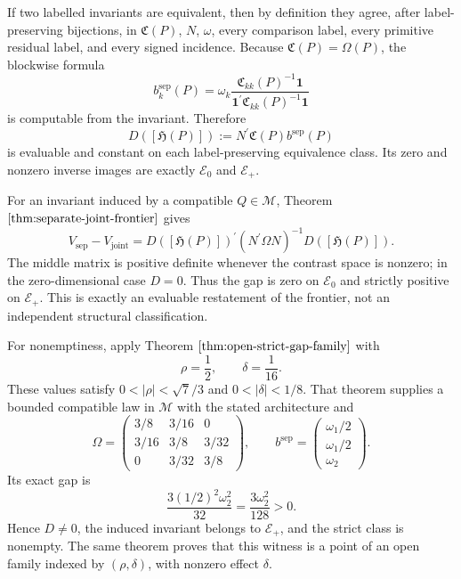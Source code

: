 If two labelled invariants are equivalent, then by definition they agree, after label-preserving bijections, in \(\mathfrak C(P)\), \(N\), \(\omega\), every comparison label, every primitive residual label, and every signed incidence.  Because \(\mathfrak C(P)=\Omega(P)\), the blockwise formula
\[
 b_k^{\mathrm{sep}}(P)
 =\omega_k\frac{\mathfrak C_{kk}(P)^{-1}\mathbf 1}
 {\mathbf 1^{\prime}\mathfrak C_{kk}(P)^{-1}\mathbf 1}
\]
is computable from the invariant.  Therefore
\[
 D([\mathfrak H(P)])
 :=N^{\prime}\mathfrak C(P)b^{\mathrm{sep}}(P)
\]
is evaluable and constant on each label-preserving equivalence class.  Its zero and nonzero inverse images are exactly \(\mathscr E_0\) and \(\mathscr E_+\).

For an invariant induced by a compatible \(Q\in\mathcal M\), Theorem \(\ref{thm:separate-joint-frontier}\) gives
\[
 V_{\mathrm{sep}}-V_{\mathrm{joint}}
 =D([\mathfrak H(P)])^{\prime}
  (N^{\prime}\Omega N)^{-1}
  D([\mathfrak H(P)]).
\]
The middle matrix is positive definite whenever the contrast space is nonzero; in the zero-dimensional case \(D=0\).  Thus the gap is zero on \(\mathscr E_0\) and strictly positive on \(\mathscr E_+\).  This is exactly an evaluable restatement of the frontier, not an independent structural classification.

For nonemptiness, apply Theorem \(\ref{thm:open-strict-gap-family}\) with
\[
 \rho=\frac12,
 \qquad
 \delta=\frac1{16}.
\]
These values satisfy \(0<|\rho|<\sqrt7/3\) and \(0<|\delta|<1/8\).  That theorem supplies a bounded compatible law in \(\mathcal M\) with the stated architecture and
\[
 \Omega=
 \begin{pmatrix}
 3/8&3/16&0\\
 3/16&3/8&3/32\\
 0&3/32&3/8
 \end{pmatrix},
 \qquad
 b^{\mathrm{sep}}=
 \begin{pmatrix}\omega_1/2\\ \omega_1/2\\ \omega_2\end{pmatrix}.
\]
Its exact gap is
\[
 \frac{3(1/2)^2\omega_2^2}{32}
 =\frac{3\omega_2^2}{128}>0.
\]
Hence \(D\ne0\), the induced invariant belongs to \(\mathscr E_+\), and the strict class is nonempty.  The same theorem proves that this witness is a point of an open family indexed by \((\rho,\delta)\), with nonzero effect \(\delta\).
